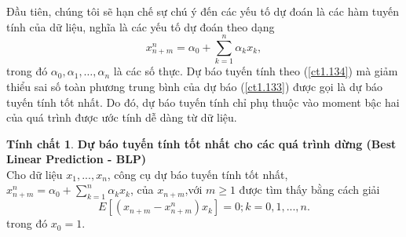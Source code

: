 \documentclass[12pt, a4paper,oneside]{book}
\theoremstyle{definition}
\newtheorem{tc}[theo]{Tính chất}
\begin{document}
Đầu tiên, chúng tôi sẽ hạn chế sự chú ý đến các yếu tố dự đoán là các hàm tuyến tính của dữ liệu, nghĩa là các yếu tố dự đoán theo dạng
\begin{equation}
x_{n+m}^n =\alpha_{0} + \sum_{k=1}^{n} \alpha_{k} x_{k}, \label{ct1.134}
\end{equation}
trong đó $\alpha_{0}, \alpha_{1},\dots, \alpha_{n}$ là các số thực. Dự báo tuyến tính theo (\ref{ct1.134}) mà giảm thiểu sai số toàn phương trung bình của dự báo (\ref{ct1.133}) được gọi là dự báo tuyến tính tốt nhất. Do đó, dự báo tuyến tính chỉ phụ thuộc vào moment bậc hai của quá trình được ước tính dễ dàng từ dữ liệu.
\begin{tc}\textbf{\label{BLP}Dự báo tuyến tính tốt nhất cho các quá trình dừng (Best Linear Prediction - BLP)}\\
Cho dữ liệu $x_{1},..., x_{n}$, công cụ dự báo tuyến tính tốt nhất, $x_{n+m}^n= \alpha_{0} + \sum_{k=1}^{n}\alpha_{k} x_{k}$, của $x_{n+m}$,với $m\geq1$ được tìm thấy bằng cách giải
\begin{equation}
 E[(x_{n+m} - x_{n+m}^n)x_{k}] = 0; k=0,1,...,n. \label{ct1.135}
\end{equation}
trong đó $x_{0}=1$.
\end{tc}
\end{document}
